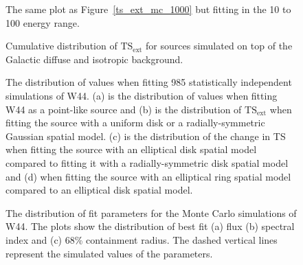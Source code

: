 \documentclass[12pt,preprint]{aastex}
\newif\ifcolorfigure
\newcommand{\gev}{\text{GeV}\xspace}
\newcommand{\tsext}{{\ensuremath{\text{TS}_{\text{ext}}}}\xspace}
\newcommand{\ts}{\text{TS}\xspace}
\begin{document}
\clearpage
\begin{figure}
    \ifcolorfigure
    \plotone{mc_plots/ts_ext_emin_10000_color.eps}
    \else
    \fi
    \caption{
    The same plot as Figure~\ref{ts_ext_mc_1000} but fitting in the 10 \gev to 100 \gev energy 
    range.
    }\label{ts_ext_mc_10000}
  \end{figure}


\clearpage
\begin{figure}
    \ifcolorfigure
    \plotone{mc_plots/plot_tsext_plane_color.eps}
    \else
    \fi
    \caption{
    Cumulative distribution of \tsext
    for sources simulated on top of the Galactic diffuse and isotropic background.
    }\label{tsext_plane_plot}
  \end{figure}


\clearpage
\begin{figure}
    \ifcolorfigure
    \plotone{mc_plots/ts_comparison_w44sim_color.eps}
    \else
    \fi
    \caption{
    The distribution of \ts values when fitting 985 statistically
    independent simulations of W44. (a) is the distribution of \ts values
    when fitting W44 as a point-like source and (b) is the
    distribution of \tsext when fitting the source with a uniform disk or a 
    radially-symmetric Gaussian
    spatial model. (c) is the distribution of the change in TS when
    fitting the source with an elliptical disk spatial model compared to
    fitting it with a radially-symmetric disk spatial model and (d) 
    when fitting the source with an elliptical ring spatial model compared
    to an elliptical disk spatial model.
    }\label{ts_comparison_w44sim}
\end{figure}

\clearpage
\begin{figure}
    \ifcolorfigure
    \plotone{mc_plots/bias_w44sim_color.eps}
    \else
    \fi
    \caption{
    The distribution of fit parameters
    for the Monte Carlo simulations of W44.
    The plots show the distribution of 
    best fit (a) flux (b) spectral index and (c) 68\% containment
    radius. The dashed vertical lines represent
    the simulated values of the parameters.
    }\label{bias_w44sim}
\end{figure}
\end{document}
